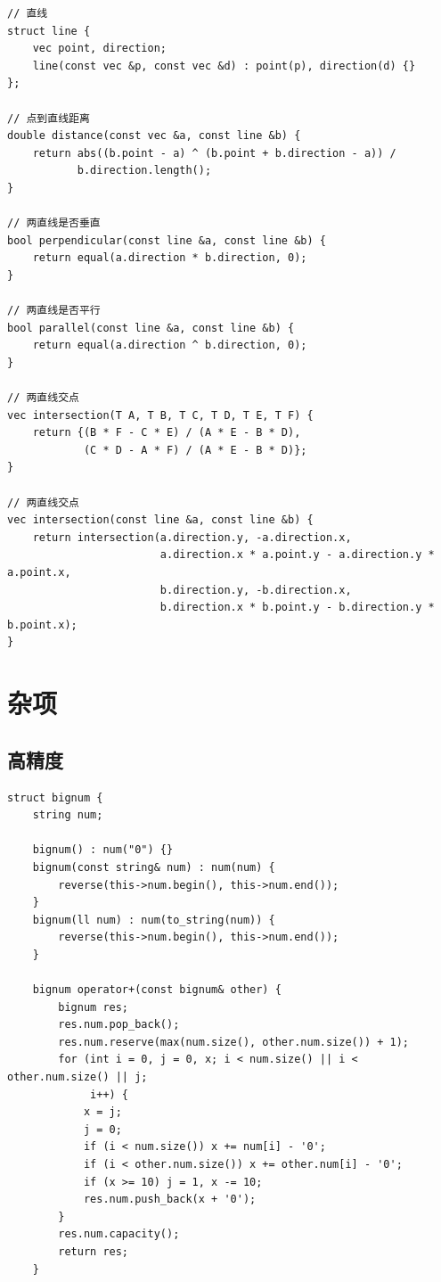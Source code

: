 \documentclass[UTF8]{ctexart}
\begin{document}
\begin{sloppypar}
\begin{lstlisting}[style=cpp]
// 直线
struct line {
    vec point, direction;
    line(const vec &p, const vec &d) : point(p), direction(d) {}
};

// 点到直线距离
double distance(const vec &a, const line &b) {
    return abs((b.point - a) ^ (b.point + b.direction - a)) /
           b.direction.length();
}

// 两直线是否垂直
bool perpendicular(const line &a, const line &b) {
    return equal(a.direction * b.direction, 0);
}

// 两直线是否平行
bool parallel(const line &a, const line &b) {
    return equal(a.direction ^ b.direction, 0);
}

// 两直线交点
vec intersection(T A, T B, T C, T D, T E, T F) {
    return {(B * F - C * E) / (A * E - B * D),
            (C * D - A * F) / (A * E - B * D)};
}

// 两直线交点
vec intersection(const line &a, const line &b) {
    return intersection(a.direction.y, -a.direction.x,
                        a.direction.x * a.point.y - a.direction.y * a.point.x,
                        b.direction.y, -b.direction.x,
                        b.direction.x * b.point.y - b.direction.y * b.point.x);
}
\end{lstlisting}

\section{杂项}

\subsection{高精度}

\begin{lstlisting}[style=cpp]
struct bignum {
    string num;

    bignum() : num("0") {}
    bignum(const string& num) : num(num) {
        reverse(this->num.begin(), this->num.end());
    }
    bignum(ll num) : num(to_string(num)) {
        reverse(this->num.begin(), this->num.end());
    }

    bignum operator+(const bignum& other) {
        bignum res;
        res.num.pop_back();
        res.num.reserve(max(num.size(), other.num.size()) + 1);
        for (int i = 0, j = 0, x; i < num.size() || i < other.num.size() || j;
             i++) {
            x = j;
            j = 0;
            if (i < num.size()) x += num[i] - '0';
            if (i < other.num.size()) x += other.num[i] - '0';
            if (x >= 10) j = 1, x -= 10;
            res.num.push_back(x + '0');
        }
        res.num.capacity();
        return res;
    }


\end{lstlisting}
\end{sloppypar}
\end{document}
